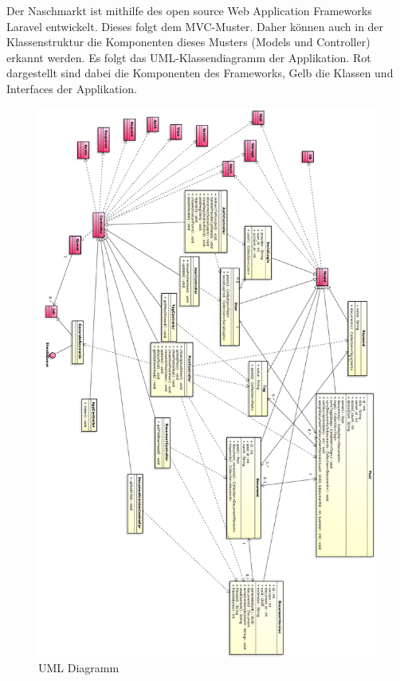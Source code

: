 Der Naschmarkt ist mithilfe des open source Web Application Frameworks Laravel\cite{laravel} entwickelt.
Dieses folgt dem MVC-Muster.
Daher k\"onnen auch in der Klassenstruktur die Komponenten dieses Musters (Models und Controller) erkannt werden.
Es folgt das UML-Klassendiagramm der Applikation.
Rot dargestellt sind dabei die Komponenten des Frameworks, Gelb die Klassen und Interfaces der Applikation.

\begin{figure}
    \begin{center}
		\includegraphics[width=\linewidth]{images/UML_Classdiagramm.pdf}
		\caption{UML Diagramm}
    \end{center}
\end{figure}

